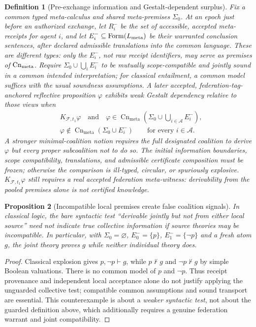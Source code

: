 \documentclass[10pt,letterpaper]{article}
\newtheorem{definition}{Definition}[section]
\newtheorem{proposition}[definition]{Proposition}
\theoremstyle{remark}\newtheorem{remark}[definition]{Remark}
\newcommand{\F}{\mathcal{F}}
\newcommand{\Ag}{\mathcal{A}}
\newcommand{\Cn}{\operatorname{Cn}}
\begin{document}
\begin{definition}[Pre-exchange information and Gestalt-dependent surplus]
Fix a common typed meta-calculus and shared meta-premises $\Sigma_0$. At an epoch just before an authorized exchange, let $R_i^-$ be the set of accessible, accepted meta-\emph{receipts} for agent $i$, and let $E_i^-\subseteq\operatorname{Form}(L_{\rm meta})$ be their \emph{warranted conclusion sentences}, after declared admissible translations into the common language. These are different types: only the $E_i^-$, not raw receipt identifiers, may serve as premises of $\Cn_{\rm meta}$. Require $\Sigma_0\cup\bigcup_i E_i^-$ to be mutually scope-compatible and jointly sound in a common intended interpretation; for classical entailment, a common model suffices with the usual soundness assumptions. A later accepted, federation-tag-anchored reflective proposition $\varphi$ exhibits \emph{weak Gestalt dependency} relative to those views when
\[
\begin{split}
&K_{\F,t_1}\varphi\quad\text{and}\quad
\varphi\in\Cn_{\mathrm{meta}}\!\left(\Sigma_0\cup\bigcup_{i\in\Ag}E_i^-\right),\\[-2pt]
&\varphi\notin\Cn_{\mathrm{meta}}(\Sigma_0\cup E_i^-)
\qquad\text{for every }i\in\Ag.
\end{split}
\]
A stronger \emph{minimal-coalition} notion requires the full designated coalition to derive $\varphi$ but every proper subcoalition not to do so. The initial information boundaries, scope compatibility, translations, and admissible certificate composition must be frozen; otherwise the comparison is ill-typed, circular, or spuriously explosive. $K_{\F,t_1}\varphi$ still requires a real accepted federation meta-witness: derivability from the pooled premises alone is not certified knowledge.
\end{definition}

\begin{proposition}[Incompatible local premises create false coalition signals]
In classical logic, the bare syntactic test ``derivable jointly but not from either local source'' need not indicate true collective information if source theories may be incompatible. In particular, with $\Sigma_0=\varnothing$, $E_0^-=\{p\}$, $E_1^-=\{\neg p\}$ and a fresh atom $g$, the joint theory proves $g$ while neither individual theory does.
\end{proposition}
\begin{proof}
Classical explosion gives $p,\neg p\vdash g$, while $p\not\vdash g$ and $\neg p\not\vdash g$ by simple Boolean valuations. There is no common model of $p$ and $\neg p$. Thus receipt provenance and independent local acceptance alone do not justify applying the unguarded collective test; compatible common assumptions and sound transport are essential. This counterexample is about a \emph{weaker syntactic test}, not about the guarded definition above, which additionally requires a genuine federation warrant and joint compatibility.
\end{proof}
\end{document}
